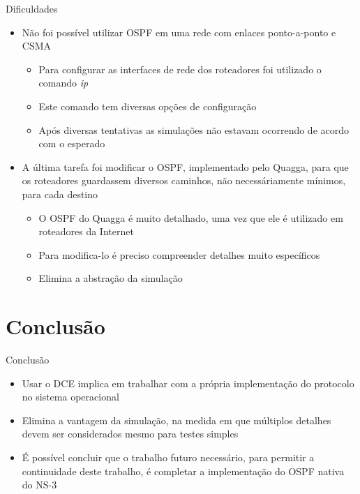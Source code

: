 \documentclass{beamer}
\newlength{\wideitemsep}
\let\olditem\item
\renewcommand{\item}{\setlength{\itemsep}{\wideitemsep}\olditem}
\begin{document}
\begin{frame}{Dificuldades}
\begin{itemize}
 \item Não foi possível utilizar OSPF em uma rede com enlaces ponto-a-ponto e CSMA %
  \begin{itemize}
   \olditem Para configurar as interfaces de rede dos roteadores foi utilizado o comando \textit{ip} %
   \olditem Este comando tem diversas opções de configuração %
   \olditem Após diversas tentativas as simulações não estavam ocorrendo de acordo com o esperado %
  \end{itemize}
 \item A última tarefa foi modificar o OSPF, implementado pelo Quagga, para que os roteadores guardassem diversos caminhos, não necessáriamente mínimos, para cada destino %
   \begin{itemize}
   \olditem O OSPF do Quagga é muito detalhado, uma vez que ele é utilizado em roteadores da Internet %
   \olditem Para modifica-lo é preciso compreender detalhes muito específicos  %
   \olditem Elimina a abstração da simulação %
  \end{itemize}
\end{itemize}
\end{frame}

\section{Conclusão}
\begin{frame}{Conclusão}
\begin{itemize}
 \item Usar o DCE implica em trabalhar com a própria implementação do protocolo no sistema operacional %
 \item Elimina a vantagem da simulação, na medida em que múltiplos detalhes devem ser considerados mesmo para testes simples %
 \item É possível concluir que o trabalho futuro necessário, para permitir a continuidade deste trabalho, é completar a implementação do OSPF nativa do NS-3 %
\end{itemize}
\end{frame}

\end{document}
